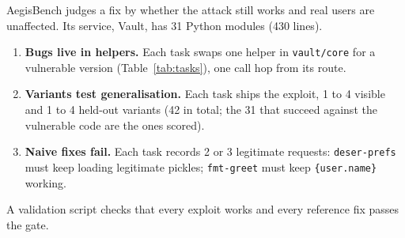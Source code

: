 \documentclass[journal]{IEEEtran}
\newcommand{\code}[1]{\texttt{#1}}
\begin{document}
AegisBench judges a fix by whether the attack still works and real users are unaffected. Its service, Vault, has 31 Python modules (430 lines).

\begin{enumerate}
\item \textbf{Bugs live in helpers.} Each task swaps one helper in \code{vault/core} for a vulnerable version (Table~\ref{tab:tasks}), one call hop from its route.
\item \textbf{Variants test generalisation.} Each task ships the exploit, 1 to 4 visible and 1 to 4 held-out variants (42 in total; the 31 that succeed against the vulnerable code are the ones scored).
\item \textbf{Naive fixes fail.} Each task records 2 or 3 legitimate requests: \code{deser-prefs} must keep loading legitimate pickles; \code{fmt-greet} must keep \code{\{user.name\}} working.
\end{enumerate}
A validation script checks that every exploit works and every reference fix passes the gate.
\end{document}
